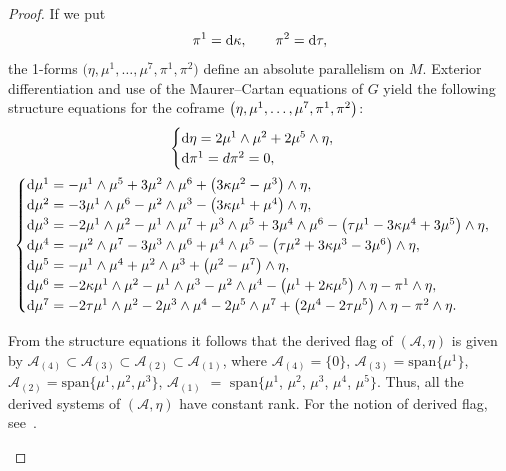\documentclass[10pt,a4paper]{amsart}
\numberwithin{equation}{section}
\begin{document}
\begin{proof}
If we put
\[
 \pi^1={\rm d}\kappa,\qquad \pi^2={\rm d}\tau,
\]
the 1-forms $\big(\eta,\mu^1,\dots,\mu^7,\pi^1,\pi^2\big)$ define an absolute parallelism on $M$.
%
Exterior differentiation and use of the Maurer--Cartan equations of ${G}$ yield the following structure equations
for the coframe $\big(\eta,\mu^1,\mathellipsis,\mu^7,\pi^1,\pi^2\big)$:
\begin{gather}\label{quadratic1}
\begin{cases}
{\rm d}\eta =2\mu^1\wedge\mu^2+2\mu^5\wedge\eta,\\
{\rm d}\pi^1=d\pi^2=0,\\
\end{cases}
\\
\label{quadratic2}
\begin{cases}
{\rm d}\mu^1=-\mu^1\wedge\mu^5+3\mu^2\wedge\mu^6+\big(3\kappa\mu^2-\mu^3\big)\wedge\eta,	\\
{\rm d}\mu^2=-3\mu^1\wedge\mu^6 - \mu^2\wedge\mu^3 - \big(3\kappa\mu^1+ \mu^4\big)\wedge\eta,	\\
{\rm d}\mu^3=-2\mu^1\wedge\mu^2-\mu^1\wedge\mu^7+\mu^3\wedge\mu^5+3\mu^4\wedge\mu^6  - \big(\tau\mu^1- 3\kappa\mu^4+3\mu^5\big)\wedge\eta,	\\
{\rm d}\mu^4=-\mu^2\wedge\mu^7- 3\mu^3\wedge\mu^6+\mu^4\wedge\mu^5 - \big(\tau\mu^2+ 3\kappa\mu^3-3\mu^6\big)\wedge\eta, \\
{\rm d}\mu^5=-\mu^1\wedge\mu^4+\mu^2\wedge\mu^3 + \big(\mu^2-\mu^7\big)\wedge\eta,	\\
{\rm d}\mu^6=-2\kappa\mu^1\wedge\mu^2-\mu^1\wedge\mu^3-\mu^2\wedge\mu^4 - \big(\mu^1+ 2\kappa\mu^5\big)\wedge\eta - \pi^1\wedge\eta,	\\
{\rm d}\mu^7=-2\tau\mu^1\wedge\mu^2-2\mu^3\wedge\mu^4-2\mu^5\wedge\mu^7  + \big(2\mu^4- 2\tau\mu^5\big)\wedge\eta - \pi^2\wedge\eta.	\\
\end{cases}
\end{gather}

\begin{Remark}\label{r:derived-flags}
From the structure equations it follows that the derived flag of $(\mathcal{A},\eta)$ is given by
$\mathcal{A}_{(4)} \subset \mathcal{A}_{ (3) } \subset \mathcal{A}_{ (2)} \subset \mathcal{A}_{ (1)}$, where
$\mathcal{A}_{(4)} = \{0\}$, $\mathcal{A}_{ (3) }= \text{span}\big\{\mu^1\big\}$, $\mathcal{A}_{ (2)} = \text{span}\big\{\mu^1,\mu^2,\mu^3\big\}$,
$\mathcal{A}_{ (1)}$ $=$ $\text{span}\big\{\mu^1$, $\mu^2$, $\mu^3$, $\mu^4$, $\mu^5\big\}$.
Thus, all the derived systems of $(\mathcal{A},\eta)$ have constant rank. For the notion of derived flag, see~\cite{Gr}.
\end{Remark}


\end{proof}
\end{document}
